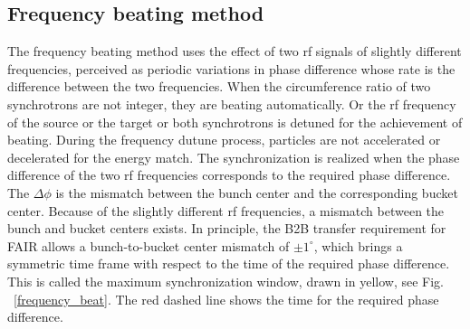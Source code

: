 
\subsection{Frequency beating method}

The frequency beating method uses the effect of two rf signals of slightly different frequencies, perceived as periodic variations in phase difference whose rate is the difference between the two frequencies. When the circumference ratio of two synchrotrons are not integer, they are beating automatically. Or the rf frequency of the source or the target or both synchrotrons is detuned for the achievement of beating. During the frequency dutune process, particles are not accelerated or decelerated for the energy match. The synchronization is realized when the phase difference of the two rf frequencies corresponds to the required phase difference. The $\Delta \phi$ is the mismatch between the bunch center and the corresponding bucket center. Because of the slightly different rf frequencies, a mismatch between the bunch and bucket centers exists. In principle, the B2B transfer requirement for FAIR allows a bunch-to-bucket center mismatch of $\pm1^\circ$, which brings a symmetric time frame with respect to the time of the required phase difference. This is called the maximum synchronization window, drawn in yellow, see Fig. ~\ref{frequency_beat}. The red dashed line shows the time for the required phase difference.


